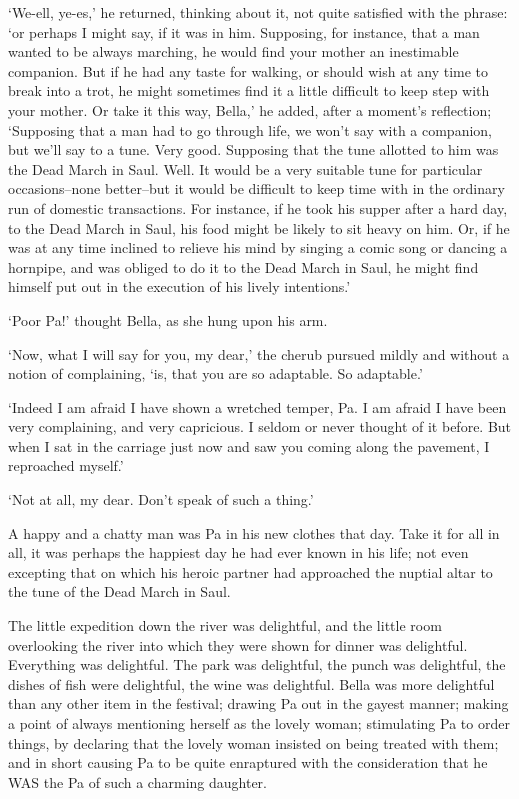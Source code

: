 ‘We-ell, ye-es,’ he returned, thinking about it, not quite satisfied
with the phrase: ‘or perhaps I might say, if it was in him. Supposing,
for instance, that a man wanted to be always marching, he would find
your mother an inestimable companion. But if he had any taste for
walking, or should wish at any time to break into a trot, he might
sometimes find it a little difficult to keep step with your mother.
Or take it this way, Bella,’ he added, after a moment’s reflection;
‘Supposing that a man had to go through life, we won’t say with a
companion, but we’ll say to a tune. Very good. Supposing that the tune
allotted to him was the Dead March in Saul. Well. It would be a very
suitable tune for particular occasions--none better--but it would
be difficult to keep time with in the ordinary run of domestic
transactions. For instance, if he took his supper after a hard day, to
the Dead March in Saul, his food might be likely to sit heavy on him.
Or, if he was at any time inclined to relieve his mind by singing a
comic song or dancing a hornpipe, and was obliged to do it to the Dead
March in Saul, he might find himself put out in the execution of his
lively intentions.’

‘Poor Pa!’ thought Bella, as she hung upon his arm.

‘Now, what I will say for you, my dear,’ the cherub pursued mildly and
without a notion of complaining, ‘is, that you are so adaptable. So
adaptable.’

‘Indeed I am afraid I have shown a wretched temper, Pa. I am afraid
I have been very complaining, and very capricious. I seldom or never
thought of it before. But when I sat in the carriage just now and saw
you coming along the pavement, I reproached myself.’

‘Not at all, my dear. Don’t speak of such a thing.’

A happy and a chatty man was Pa in his new clothes that day. Take it
for all in all, it was perhaps the happiest day he had ever known in his
life; not even excepting that on which his heroic partner had approached
the nuptial altar to the tune of the Dead March in Saul.

The little expedition down the river was delightful, and the little
room overlooking the river into which they were shown for dinner was
delightful. Everything was delightful. The park was delightful, the
punch was delightful, the dishes of fish were delightful, the wine
was delightful. Bella was more delightful than any other item in the
festival; drawing Pa out in the gayest manner; making a point of always
mentioning herself as the lovely woman; stimulating Pa to order things,
by declaring that the lovely woman insisted on being treated with them;
and in short causing Pa to be quite enraptured with the consideration
that he WAS the Pa of such a charming daughter.

